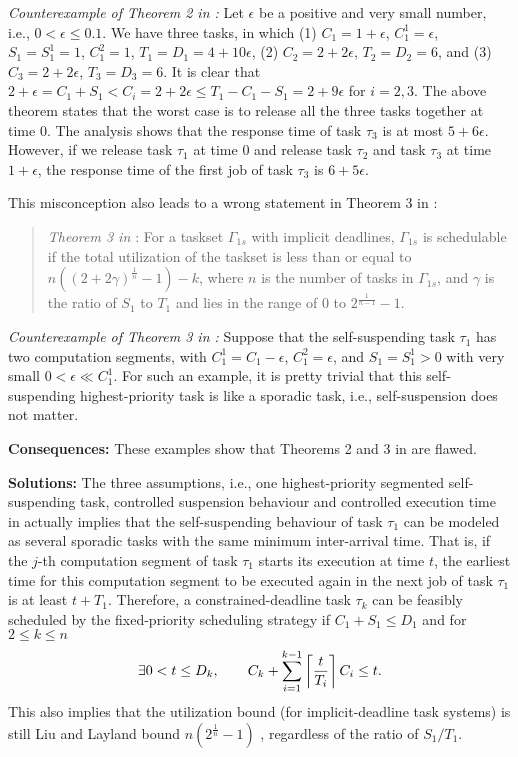 {\it Counterexample of Theorem 2 in \cite{RTSS-KimANR13}:} Let $\epsilon$ be a positive and very small number, i.e., $0 < \epsilon \leq 0.1$. We have three tasks, in which
(1) $C_1= 1+ \epsilon$, $C_1^1 = \epsilon$, $S_1=S_1^1 = 1$, $C_1^2  = 1$, $T_{1} =D_1= 4 + 10 \epsilon$, (2) $C_2 = 2 + 2\epsilon$, $T_2 =D_2= 6$, and (3)
$C_3 = 2 + 2\epsilon$, $T_3 =D_3= 6$. It is clear that $2+\epsilon = C_1+S_1 < C_i = 2+2\epsilon \leq T_1-C_1-S_1 = 2+9\epsilon$ for $i=2,3$. The above theorem states that the worst case is to release all the three tasks together at time $0$. The analysis shows that the response time of task $\tau_3$ is at most $5+6\epsilon$. However, if we release task $\tau_1$ at time $0$ and release task $\tau_2$ and task $\tau_3$ at time $1+\epsilon$, the response time of the first job of task $\tau_3$ is $6+5\epsilon$. 

This misconception also leads to a wrong statement in Theorem 3 in \cite{RTSS-KimANR13}:
\begin{quote}
{\it Theorem 3 in \cite{RTSS-KimANR13}}: For a taskset $\Gamma_{1s}$ with implicit deadlines, $\Gamma_{1s}$ is schedulable if the total utilization of the taskset is less than or equal to $n((2+2\gamma)^{\frac{1}{n}}-1)-k$, where $n$ is the number of tasks in $\Gamma_{1s}$, and $\gamma$ is the ratio of
$S_1$ to $T_1$ and lies in the range of $0$ to $2^{\frac{1}{n-1}}-1$. 
\end{quote}


{\it Counterexample of Theorem 3 in \cite{RTSS-KimANR13}:} Suppose that the self-suspending task $\tau_1$ has two computation segments, with $C_1^1 = C_1-\epsilon$, $C_1^2 = \epsilon$, and $S_1=S_1^1 > 0$ with very small $0 < \epsilon \ll C_1^1$. For such an example, it is pretty trivial that this self-suspending highest-priority task is like a sporadic task, i.e., self-suspension does not matter. 

{\bf Consequences:} These examples show that Theorems 2 and 3 in \cite{RTSS-KimANR13} are flawed.  

{\bf Solutions:} The three assumptions, i.e., one highest-priority segmented self-suspending task, controlled suspension behaviour and controlled execution time  in \cite{RTSS-KimANR13} actually implies that the self-suspending behaviour of task $\tau_1$ can be modeled as several sporadic tasks with the same minimum inter-arrival time. That is, if the $j$-th computation segment of task $\tau_1$ starts its execution at time $t$, the earliest time for this computation segment to be executed again in the next job of task $\tau_1$ is at least $t+T_1$. Therefore, a constrained-deadline task $\tau_k$ can be feasibly scheduled by the fixed-priority scheduling strategy if $C_1+S_1 \leq D_1$ and for $2 \leq k \leq n$
  \begin{equation}
    \label{eq:tda-fixed}
\exists 0 < t \leq D_k, \qquad C_k + \sum_{i=1}^{k-1}\left\lceil{\frac{t}{T_i}}\right\rceil C_i \leq t.    
  \end{equation}
This also implies that the utilization bound (for implicit-deadline task systems) is still Liu and Layland bound $n(2^{\frac{1}{n}}-1)$ \cite{Liu_1973}, regardless of the ratio of $S_1/T_1$. 

